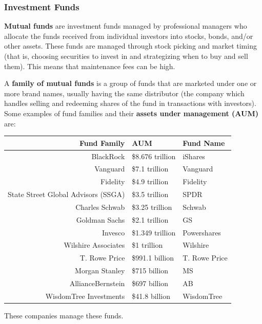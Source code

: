 \documentclass{article}
\begin{document}
    \subsubsection{Investment Funds}

      \begin{definition}
        \textbf{Mutual funds} are investment funds managed by professional managers who allocate the funds received from individual investors into stocks, bonds, and/or other assets. These funds are managed through stock picking and market timing (that is, choosing securities to invest in and strategizing when to buy and sell them). This means that maintenance fees can be high. 
      \end{definition}

      \begin{definition}
        A \textbf{family of mutual funds} is a group of funds that are marketed under one or more brand names, usually having the same distributor (the company which handles selling and redeeming shares of the fund in transactions with investors). Some examples of fund families and their \textbf{assets under management (AUM)} are: 
        \begin{center}
        \begin{tabular}{r|l|l}
          Fund Family & AUM & Fund Name\\
          \hline
          BlackRock & \$8.676 trillion & iShares\\
          Vanguard & \$7.1 trillion & Vanguard\\
          Fidelity & \$4.9 trillion & Fidelity\\
          State Street Global Advisors (SSGA) & \$3.5 trillion & SPDR\\
          Charles Schwab & \$3.25 trillion & Schwab\\
          Goldman Sachs & \$2.1 trillion & GS\\
          Invesco & \$1.349 trillion & Powershares\\
          Wilshire Associates & \$1 trillion & Wilshire\\
          T. Rowe Price & \$991.1 billion & T. Rowe Price \\
          Morgan Stanley & \$715 billion & MS\\
          AllianceBernstein & \$697 billion & AB \\
          WisdomTree Investments & \$41.8 billion & WisdomTree
        \end{tabular}
        \end{center}
        These companies manage these funds. 
      \end{definition}
\end{document}
